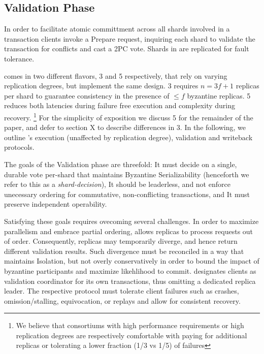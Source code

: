 \subsection{Validation Phase}

In order to facilitate atomic committment across all shards involved in a transaction \sys clients invoke a Prepare request, inquiring each shard to validate the transaction for conflicts and cast a 2PC vote. Shards in \sys are replicated for fault tolerance.

\sys comes in two different flavors, \sys{}3 and \sys{}5 respectively, that rely on varying replication degrees, but implement the same design. \sys{}3 requires $n=3f+1$ replicas  per shard to guarantee consistency in the presence of $\leq f$ byzantine replicas. \sys{}5 reduces both latencies during failure free execution and complexity during recovery. \footnote{We believe that consortiums with high performance requirements or high replication degrees are respectively comfortable with paying for additional replicas or tolerating a lower fraction (1/3 vs 1/5) of failures}
For the simplicity of exposition we discuss \sys{}5 for the remainder of the paper, and defer to section X  to describe differences in \sys{}3. In the following, we outline \sys 's execution (unaffected by replication degree), validation and writeback protocols.

The goals of the Validation phase are threefold: \one It must decide on a single, durable vote per-shard that maintains Byzantine Serializability (henceforth we refer to this as a \textit{shard-decision}), \two It should be leaderless, and not enforce unecessary ordering for commutative, non-conflicting transactions, and \three It must preserve independent operability. 

Satisfying these goals requires ovecoming several challenges. In order to maximize parallelism and embrace partial ordering, \sys allows replicas to process requests out of order. Consequently, replicas may temporarily diverge, and hence return different validation results. Such divergence must be reconciled in a way that maintains Isolation, but not overly conservatively in order to bound the impact of byzantine participants and maximize likehlihood to commit. \sys designates clients as validation coordinator for its own transactions, thus omitting a dedicated replica leader. The respective protocol must tolerate client failures such as crashes, omission/stalling, equivocation, or replays and allow for consistent recovery. 

